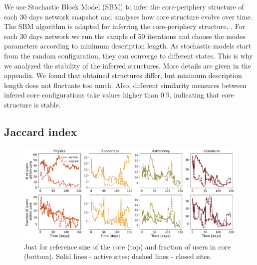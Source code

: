 We use Stochastic Block Model (SBM) to infer the core-periphery structure of each 30 days network snapshot and analyses how core structure evolve over time.  The  SBM algorithm is adapted for inferring the core-periphery structure, \cite{gallagher2020clarified}. For each 30 days network we run the sample of 50 iterations and choose the modes parameters according to minimum description length. As stochastic models start from the random configuration, they can converge to different states. This is why we analyzed the stability of the inferred structures. More details are given in the appendix. We found that obtained structures differ, but minimum description length does not fluctuate too much. Also, different similarity measures between infered core configurations take values higher than 0.9, indicating that core structure is stable. 

\subsection{Jaccard index}


\begin{figure}[h!]
	\centering
	\includegraphics[width=\linewidth]{figures/stackexchange/core_users.pdf}
	\caption{Just for reference size of the core (top) and fraction of users in core (bottom). Solid lines - active sites; dashed lines - closed sites.}
	\label{fig:core_size}
\end{figure}

